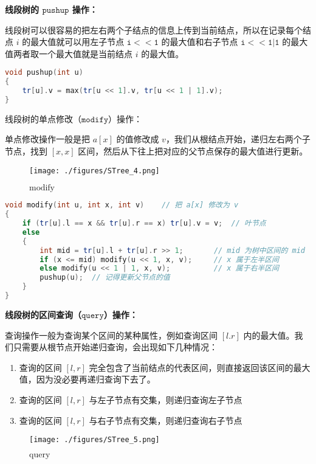 \textbf{线段树的 $\texttt{pushup}$ 操作：}

线段树可以很容易的把左右两个子结点的信息上传到当前结点，所以在记录每个结点 $i$ 的最大值就可以用左子节点 $\mathtt{i<<1}$ 的最大值和右子节点 $\mathtt{i<<1|1}$ 的最大值两者取一个最大值就是当前结点 $i$ 的最大值。

\begin{lstlisting}[language=cpp]
void pushup(int u)
{
    tr[u].v = max(tr[u << 1].v, tr[u << 1 | 1].v);
}
\end{lstlisting}

线段树的单点修改（$\texttt{modify}$）操作：

单点修改操作一般是把 $a[x]$ 的值修改成 $v$，我们从根结点开始，递归左右两个子节点，找到 $[x, x]$ 区间，然后从下往上把对应的父节点保存的最大值进行更新。

\begin{figure}[ht]
\centering
\texttt{[image: ./figures/STree\_4.png]}
\caption{$\text{modify}$} \label{STree_fig4}
\end{figure}


\begin{lstlisting}[language=cpp]
void modify(int u, int x, int v)    // 把 a[x] 修改为 v
{
    if (tr[u].l == x && tr[u].r == x) tr[u].v = v;  // 叶节点
    else
    {
        int mid = tr[u].l + tr[u].r >> 1;       // mid 为树中区间的 mid
        if (x <= mid) modify(u << 1, x, v);     // x 属于左半区间
        else modify(u << 1 | 1, x, v);          // x 属于右半区间
        pushup(u);  // 记得更新父节点的值
    }
}
\end{lstlisting}

\textbf{线段树的区间查询（$\texttt{query}$）操作：}

查询操作一般为查询某个区间的某种属性，例如查询区间 $[l. r]$ 内的最大值。我们只需要从根节点开始递归查询，会出现如下几种情况：

\begin{enumerate}
\item 查询的区间 $[l, r]$ 完全包含了当前结点的代表区间，则直接返回该区间的最大值，因为没必要再递归查询下去了。
\item 查询的区间 $[l, r]$ 与左子节点有交集，则递归查询左子节点
\item 查询的区间 $[l, r]$ 与右子节点有交集，则递归查询右子节点
\end{enumerate}

\begin{figure}[ht]
\centering
\texttt{[image: ./figures/STree\_5.png]}
\caption{$\text{query}$} \label{STree_fig5}
\end{figure}

